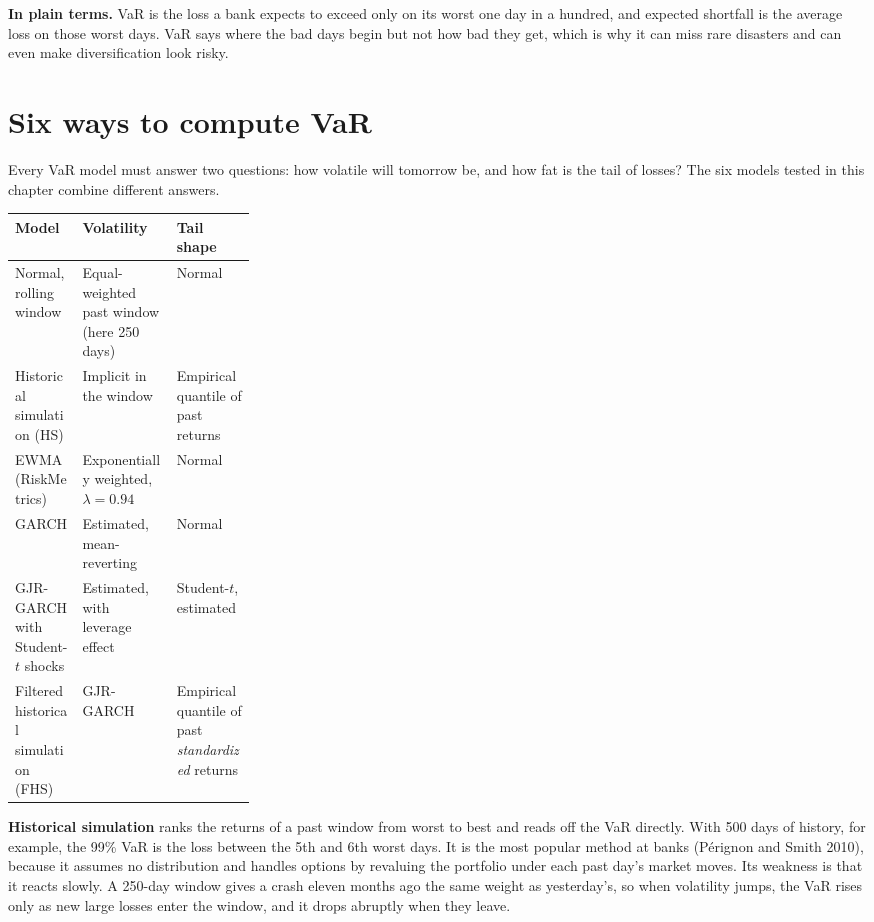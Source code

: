 \noindent\textbf{In plain terms.} VaR is the loss a bank expects to exceed only on its worst one day in a hundred, and expected shortfall is the average loss on those worst days. VaR says where the bad days begin but not how bad they get, which is why it can miss rare disasters and can even make diversification look risky.

\section{Six ways to compute VaR}
\label{sec:11-how}

Every VaR model must answer two questions: how volatile will tomorrow be, and how fat is the tail of losses? The six models tested in this chapter combine different answers.

\begin{center}
\small
\begin{tabularx}{0.9\linewidth}{@{}>{\raggedright\arraybackslash}p{0.28\linewidth}>{\raggedright\arraybackslash}X>{\raggedright\arraybackslash}X@{}}
\toprule
Model & Volatility & Tail shape \\
\midrule
Normal, rolling window & Equal-weighted past window (here 250 days) & Normal \\
Historical simulation (HS) & Implicit in the window & Empirical quantile of past returns \\
EWMA (RiskMetrics) & Exponentially weighted, $\lambda = 0.94$ & Normal \\
GARCH & Estimated, mean-reverting & Normal \\
GJR-GARCH with Student-$t$ shocks & Estimated, with leverage effect & Student-$t$, estimated \\
Filtered historical simulation (FHS) & GJR-GARCH & Empirical quantile of past \emph{standardized} returns \\
\bottomrule
\end{tabularx}
\end{center}

\textbf{Historical simulation} ranks the returns of a past window from worst to best and reads off the VaR directly. With 500 days of history, for example, the 99\% VaR is the loss between the 5th and 6th worst days. It is the most popular method at banks (P\'erignon and Smith 2010), because it assumes no distribution and handles options by revaluing the portfolio under each past day's market moves. Its weakness is that it reacts slowly. A 250-day window gives a crash eleven months ago the same weight as yesterday's, so when volatility jumps, the VaR rises only as new large losses enter the window, and it drops abruptly when they leave.

